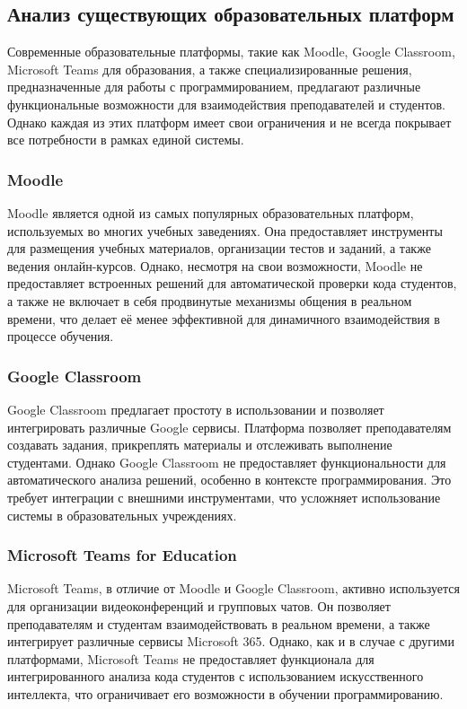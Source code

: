 \subsection*{Анализ существующих образовательных платформ}

Современные образовательные платформы, такие как Moodle, Google Classroom, Microsoft Teams для образования, а также специализированные решения, предназначенные для работы с программированием, предлагают различные функциональные возможности для взаимодействия преподавателей и студентов. Однако каждая из этих платформ имеет свои ограничения и не всегда покрывает все потребности в рамках единой системы.

\subsubsection*{Moodle}
Moodle является одной из самых популярных образовательных платформ, используемых во многих учебных заведениях. Она предоставляет инструменты для размещения учебных материалов, организации тестов и заданий, а также ведения онлайн-курсов. Однако, несмотря на свои возможности, Moodle не предоставляет встроенных решений для автоматической проверки кода студентов, а также не включает в себя продвинутые механизмы общения в реальном времени, что делает её менее эффективной для динамичного взаимодействия в процессе обучения.

\subsubsection*{Google Classroom}
Google Classroom предлагает простоту в использовании и позволяет интегрировать различные Google сервисы. Платформа позволяет преподавателям создавать задания, прикреплять материалы и отслеживать выполнение студентами. Однако Google Classroom не предоставляет функциональности для автоматического анализа решений, особенно в контексте программирования. Это требует интеграции с внешними инструментами, что усложняет использование системы в образовательных учреждениях.

\subsubsection*{Microsoft Teams for Education}
Microsoft Teams, в отличие от Moodle и Google Classroom, активно используется для организации видеоконференций и групповых чатов. Он позволяет преподавателям и студентам взаимодействовать в реальном времени, а также интегрирует различные сервисы Microsoft 365. Однако, как и в случае с другими платформами, Microsoft Teams не предоставляет функционала для интегрированного анализа кода студентов с использованием искусственного интеллекта, что ограничивает его возможности в обучении программированию.

